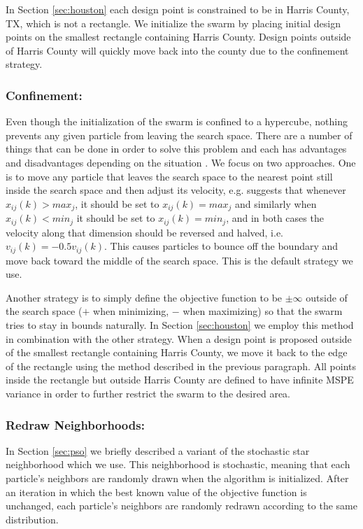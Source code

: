 \documentclass[cmbright]{staauth}
\begin{document}
In Section \ref{sec:houston} each design point is constrained to be in Harris County, TX, which is not a rectangle. We initialize the swarm by placing initial design points on the smallest rectangle containing Harris County. Design points outside of Harris County will quickly move back into the county due to the confinement strategy.

\subsubsection{Confinement:}
Even though the initialization of the swarm is confined to a hypercube, nothing prevents any given particle from leaving the search space. There are a number of things that can be done in order to solve this problem and each has advantages and disadvantages depending on the situation \citep{helwig2007particle}. We focus on two approaches. One is to move any particle that leaves the search space to the nearest point still inside the search space and then adjust its velocity, e.g. \citet{clerc2011spso} suggests that whenever $x_{ij}(k) > max_j$, it should be set to $x_{ij}(k) = max_j$ and similarly when $x_{ij}(k) < min_j$ it should be set to $x_{ij}(k) = min_j$, and in both cases the velocity along that dimension should be reversed and halved, i.e. $v_{ij}(k) = -0.5 v_{ij}(k)$. This causes particles to bounce off the boundary and move back toward the middle of the search space. This is the default strategy we use.

Another strategy is to simply define the objective function to be $\pm\infty$ outside of the search space ($+$ when minimizing, $-$ when maximizing) so that the swarm tries to stay in bounds naturally. In Section \ref{sec:houston} we employ this method in combination with the other strategy. When a design point is proposed outside of the smallest rectangle containing Harris County, we move it back to the edge of the rectangle using the method described in the previous paragraph. All points inside the rectangle but outside Harris County are defined to have infinite MSPE variance in order to further restrict the swarm to the desired area.

\subsubsection{Redraw Neighborhoods:}
In Section \ref{sec:pso} we briefly described a variant of the stochastic star neighborhood which we use. This neighborhood is stochastic, meaning that each particle's neighbors are randomly drawn when the algorithm is initialized. After an iteration in which the best known value of the objective function is unchanged, each particle's neighbors are randomly redrawn according to the same distribution.
\end{document}
